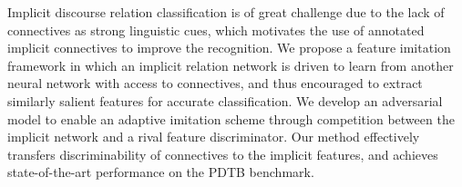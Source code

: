 Implicit discourse relation classification is of great challenge due to the lack of connectives as strong linguistic cues, which motivates the use of annotated implicit connectives to improve the recognition. We propose a feature imitation framework in which an implicit relation network is driven to learn from another neural network with access to connectives, and thus encouraged to extract similarly salient features for accurate classification. We develop an adversarial model to enable an adaptive imitation scheme through competition between the implicit network and a rival feature discriminator. Our method effectively transfers discriminability of connectives to the implicit features, and achieves state-of-the-art performance on the PDTB benchmark.
